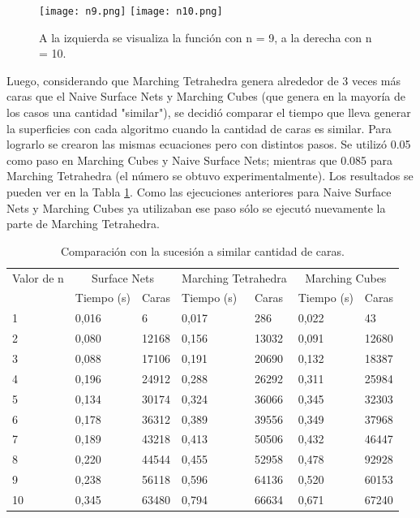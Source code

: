 \documentclass[12pt]{article}
\begin{document}
\begin{figure}[h!]
\texttt{[image: n9.png]}
\hfill
\texttt{[image: n10.png]}
\caption{ A la izquierda se visualiza la función con n = 9, a la derecha con n = 10.}
\label{ejsuc2}
\end{figure}

Luego, considerando que Marching Tetrahedra genera alrededor de 3 veces más caras que el Naive Surface Nets y Marching Cubes (que genera en la mayoría de los casos una cantidad "similar"), se decidió comparar el tiempo que lleva generar la superficies con cada algoritmo cuando la cantidad de caras es similar. Para lograrlo se crearon las mismas ecuaciones pero con distintos pasos. Se utilizó 0.05 como paso en Marching Cubes y Naive Surface Nets; mientras que 0.085 para Marching Tetrahedra (el número se obtuvo experimentalmente). Los resultados se pueden ver en la Tabla \ref{tablaSIC}. Como las ejecuciones anteriores para Naive Surface Nets y Marching Cubes ya utilizaban ese paso sólo se ejecutó nuevamente la parte de Marching Tetrahedra.

\begin{table}[h!]
  \centering
\begin{tabular}{lllllll}
\toprule 
    Valor de n & \multicolumn{2}{c}{Surface Nets} & \multicolumn{2}{c}{Marching Tetrahedra}  & \multicolumn{2}{c}{Marching Cubes}\\
    &Tiempo (s) &Caras
    &Tiempo (s) &Caras
    &Tiempo (s) &Caras \\
    \midrule
    1 & 0,016 &6 & 0,017 &286 & 0,022 &43\\
    2 & 0,080 &12168 & 0,156 &13032 & 0,091 &12680\\
    3 & 0,088 &17106 & 0,191 &20690 & 0,132 &18387\\
    4 & 0,196 &24912 & 0,288 &26292 & 0,311 &25984\\
    5 & 0,134 &30174 & 0,324 &36066 & 0,345 &32303\\
    6 & 0,178 &36312 & 0,389 &39556 & 0,349 &37968\\
    7 & 0,189 &43218 & 0,413 &50506 & 0,432 &46447\\
    8 & 0,220 &44544 & 0,455 &52958 & 0,478 &92928\\
    9 & 0,238 &56118 & 0,596 &64136 & 0,520 &60153\\
    10 & 0,345 &63480 & 0,794 &66634 & 0,671 &67240\\
    \bottomrule
\end{tabular}
  \caption{Comparación con la sucesión a similar cantidad de caras.}
  \label{tablaSIC}
\end{table}
\end{document}
